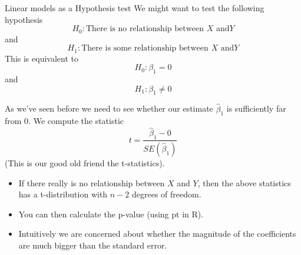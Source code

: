 \documentclass{bredelebeamer}
\begin{document}
\begin{frame}{Linear models as a Hypothesis test}
We might want to test the following hypothesis
\begin{equation}
H_0: \text{There is no relationship between } X \text{ and} Y 
\end{equation}
and
\begin{equation}
H_1: \text{There is some relationship between } X \text{ and} Y 
\end{equation}
This is equivalent to 
\begin{equation}
H_0: \beta_1 = 0
\end{equation}
and
\begin{equation}
H_1: \beta_1 \neq 0
\end{equation}
\end{frame}

\begin{frame}
As we've seen before we need to see whether our estimate $\hat{\beta}_1$ is sufficiently far from $0$. We compute the statistic
\begin{equation}
t = \frac{\hat{\beta}_1 - 0 }{SE(\hat{\beta}_1)}
\end{equation}
(This is our good old friend the t-statistics).
\\
\begin{block}
	
\begin{itemize}
\item If there really is no relationship between $X$ and $Y$, then the above statistics has a t-distribution with $n - 2$ degrees of freedom.
\item You can then calculate the p-value (using pt in R).
\item Intuitively we are concerned about whether the magnitude of the coefficients are much bigger than the standard error.
\end{itemize}
\end{block}
\end{frame}
\end{document}
